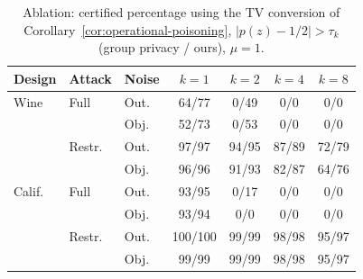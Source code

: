 \begin{table}[t]
\centering
\caption{Ablation: certified percentage using the TV conversion of Corollary~\ref{cor:operational-poisoning}, $|p(z)-1/2|>\tau_k$ (group privacy / ours), $\mu=1$.}
\label{tab:downstream-tv}
\footnotesize
\setlength{\tabcolsep}{3pt}
\begin{tabular}{lllcccc}
\toprule
Design & Attack & Noise & $k=1$ & $k=2$ & $k=4$ & $k=8$ \\
\midrule
Wine & Full & Out. & 64/77 & 0/49 & 0/0 & 0/0 \\
 &  & Obj. & 52/73 & 0/53 & 0/0 & 0/0 \\
 & Restr. & Out. & 97/97 & 94/95 & 87/89 & 72/79 \\
 &  & Obj. & 96/96 & 91/93 & 82/87 & 64/76 \\
\midrule
Calif. & Full & Out. & 93/95 & 0/17 & 0/0 & 0/0 \\
 &  & Obj. & 93/94 & 0/0 & 0/0 & 0/0 \\
 & Restr. & Out. & 100/100 & 99/99 & 98/98 & 95/97 \\
 &  & Obj. & 99/99 & 99/99 & 98/98 & 95/97 \\
\bottomrule
\end{tabular}
\end{table}
